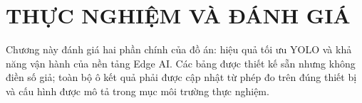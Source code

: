 \chapter{THỰC NGHIỆM VÀ ĐÁNH GIÁ}

Chương này đánh giá hai phần chính của đồ án: hiệu quả tối ưu YOLO và khả năng
vận hành của nền tảng Edge AI. Các bảng được thiết kế sẵn nhưng không điền số
giả; toàn bộ ô kết quả phải được cập nhật từ phép đo trên đúng thiết bị và cấu hình
được mô tả trong mục môi trường thực nghiệm.









